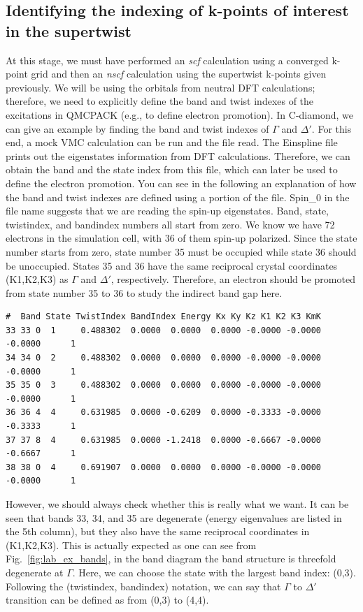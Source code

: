 \subsection{Identifying the indexing of k-points of interest in the supertwist}
At this stage, we must have performed an \textit{scf} calculation using a converged k-point grid and then an \textit{nscf} calculation using the supertwist k-points given previously. 
We will be using the orbitals from neutral DFT calculations; therefore, we need to explicitly define the band and twist indexes of the excitations in QMCPACK (e.g., to define electron promotion).
In C-diamond, we can give an example by finding the band and twist indexes of $\Gamma$ and $\Delta'$. 
For this end, a mock VMC calculation can be run and the   file read. The Einspline file prints out the eigenstates information from DFT calculations. 
Therefore, we can obtain the band and the state index from this file, which can later be used to define the electron promotion. 
You can see in the following an explanation of how the band and twist indexes are defined using a portion of the  file. 
Spin\_0 in the file name suggests that we are reading the spin-up eigenstates. Band, state, twistindex, and bandindex numbers all start from zero. We know we have 72 electrons in the simulation cell, with 36 of them spin-up polarized. 
Since the state number starts from zero, state number 35 must be occupied while state 36 should be unoccupied. 
States 35 and 36 have the same reciprocal crystal coordinates (K1,K2,K3) as $\Gamma$ and $\Delta'$, respectively. 
Therefore, an electron should be promoted from state number 35 to 36 to study the indirect band gap here.
\begin{lstlisting}[style=SHELL]
#  Band State TwistIndex BandIndex Energy Kx Ky Kz K1 K2 K3 KmK
33 33 0  1     0.488302  0.0000  0.0000  0.0000 -0.0000 -0.0000 -0.0000      1
34 34 0  2     0.488302  0.0000  0.0000  0.0000 -0.0000 -0.0000 -0.0000      1
35 35 0  3     0.488302  0.0000  0.0000  0.0000 -0.0000 -0.0000 -0.0000      1
36 36 4  4     0.631985  0.0000 -0.6209  0.0000 -0.3333 -0.0000 -0.3333      1
37 37 8  4     0.631985  0.0000 -1.2418  0.0000 -0.6667 -0.0000 -0.6667      1
38 38 0  4     0.691907  0.0000  0.0000  0.0000 -0.0000 -0.0000 -0.0000      1
\end{lstlisting}
However, we should always check whether this is really what we want. 
It can be seen  that bands 33, 34, and 35 are degenerate (energy eigenvalues are listed in the 5th column), but they also have the same reciprocal coordinates in (K1,K2,K3). 
This is actually expected as one can see from Fig.~\ref{fig:lab_ex_bands}, in the band diagram the band structure is threefold degenerate at $\Gamma$.  
Here, we can choose the state with the largest band index: (0,3). 
Following the (twistindex, bandindex) notation, we can say that $\Gamma$ to $\Delta'$ transition can be defined as from (0,3) to (4,4). 

